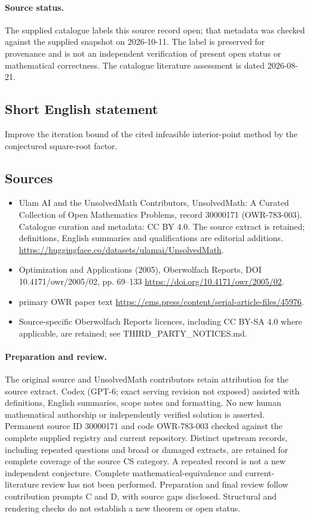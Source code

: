 \documentclass[11pt]{article}
\begin{document}
\paragraph{Source status.}
The supplied catalogue labels this source record open; that metadata was checked against the supplied snapshot on 2026-10-11. The label is preserved for provenance and is not an independent verification of present open status or mathematical correctness. The catalogue literature assessment is dated 2026-08-21.
\subsection{Short English statement}
Improve the iteration bound of the cited infeasible interior-point method by the conjectured square-root factor.
\subsection{Sources}
\begin{itemize}
\item[S1] Ulam AI and the UnsolvedMath Contributors, UnsolvedMath: A Curated Collection of Open Mathematics Problems, record 30000171 (OWR-783-003). Catalogue curation and metadata: CC BY 4.0. The source extract is retained; definitions, English summaries and qualifications are editorial additions.
\url{https://huggingface.co/datasets/ulamai/UnsolvedMath}.
\item[S2] Optimization and Applications (2005), Oberwolfach Reports, DOI 10.4171/owr/2005/02, pp. 69--133
\url{https://doi.org/10.4171/owr/2005/02}.
\item[S3] primary OWR paper text
\url{https://ems.press/content/serial-article-files/45976}.
\item Source-specific Oberwolfach Reports licences, including CC BY-SA 4.0 where applicable, are retained; see THIRD\_PARTY\_NOTICES.md.
\end{itemize}
\paragraph{Preparation and review.}
The original source and UnsolvedMath contributors retain attribution for the source extract. Codex (GPT-6; exact serving revision not exposed) assisted with definitions, English summaries, scope notes and formatting. No new human mathematical authorship or independently verified solution is asserted. Permanent source ID 30000171 and code OWR-783-003 checked against the complete supplied registry and current repository. Distinct upstream records, including repeated questions and broad or damaged extracts, are retained for complete coverage of the source CS category. A repeated record is not a new independent conjecture. Complete mathematical-equivalence and current-literature review has not been performed. Preparation and final review follow contribution prompts C and D, with source gaps disclosed. Structural and rendering checks do not establish a new theorem or open status.
\label{end:30000171}
\end{document}
